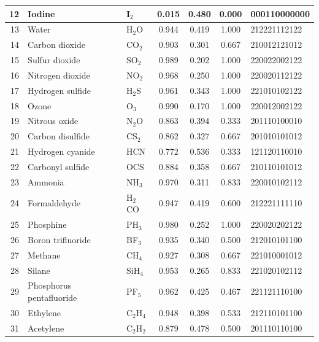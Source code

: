 \begin{table}[htbp]
\begin{tabular}{@{}rllcccl@{}}
12 & Iodine            & I$_2$                  & 0.015 & 0.480 & 0.000 & 000110000000 \\
\midrule
13 & Water             & H$_2$O                 & 0.944 & 0.419 & 1.000 & 212221112122 \\
14 & Carbon dioxide    & CO$_2$                 & 0.903 & 0.301 & 0.667 & 210012121012 \\
15 & Sulfur dioxide    & SO$_2$                 & 0.989 & 0.202 & 1.000 & 220022002122 \\
16 & Nitrogen dioxide  & NO$_2$                 & 0.968 & 0.250 & 1.000 & 220020112122 \\
17 & Hydrogen sulfide  & H$_2$S                 & 0.961 & 0.343 & 1.000 & 221010102122 \\
18 & Ozone             & O$_3$                  & 0.990 & 0.170 & 1.000 & 220012002122 \\
19 & Nitrous oxide     & N$_2$O                 & 0.863 & 0.394 & 0.333 & 201110100010 \\
20 & Carbon disulfide  & CS$_2$                 & 0.862 & 0.327 & 0.667 & 201010101012 \\
21 & Hydrogen cyanide  & HCN                    & 0.772 & 0.536 & 0.333 & 121120110010 \\
22 & Carbonyl sulfide  & OCS                    & 0.884 & 0.358 & 0.667 & 210110101012 \\
\midrule
23 & Ammonia           & NH$_3$                 & 0.970 & 0.311 & 0.833 & 220010102112 \\
24 & Formaldehyde      & H$_2$CO                & 0.947 & 0.419 & 0.600 & 212221111110 \\
25 & Phosphine         & PH$_3$                 & 0.980 & 0.252 & 1.000 & 220020202122 \\
26 & Boron trifluoride & BF$_3$                 & 0.935 & 0.340 & 0.500 & 212010101100 \\
27 & Methane           & CH$_4$                 & 0.927 & 0.308 & 0.667 & 221010001012 \\
28 & Silane            & SiH$_4$                & 0.953 & 0.265 & 0.833 & 221020102112 \\
29 & Phosphorus pentafluoride & PF$_5$          & 0.962 & 0.425 & 0.467 & 221121110100 \\
\midrule
30 & Ethylene          & C$_2$H$_4$             & 0.948 & 0.398 & 0.533 & 212110101100 \\
31 & Acetylene         & C$_2$H$_2$             & 0.879 & 0.478 & 0.500 & 201110110100 \\

\end{tabular}
\end{table}
